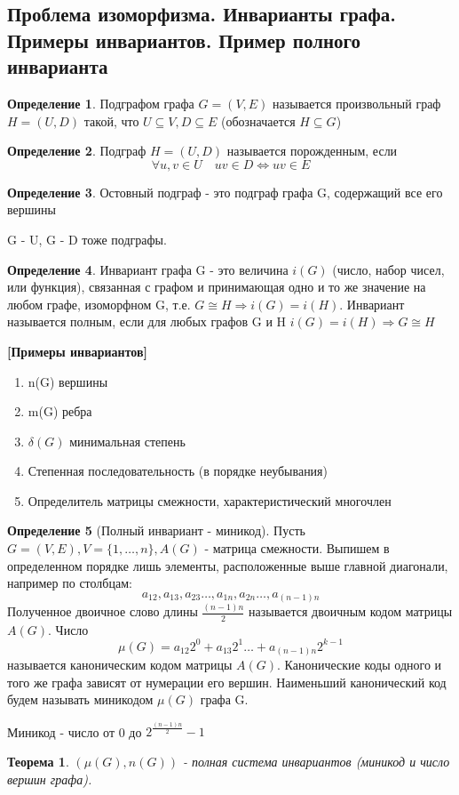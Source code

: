 \documentclass[a4paper]{article}
\newtheorem{theorem}{Теорема}[section]
\theoremstyle{definition}
\newtheorem*{definition}{Определение}
\theoremstyle{remark}
\begin{document}
\begin{multicols*}{2}
    \section{Проблема изоморфизма. Инварианты графа. Примеры инвариантов. Пример полного 
    инварианта}
    \begin{definition}
        Подграфом графа $G = (V, E)$ называется произвольный граф $H = (U, D)$ такой, что $U\subseteq V, D \subseteq E$ (обозначается $H\subseteq G$)
    \end{definition}
    \begin{definition}
        Подграф $H = (U, D)$ называется порожденным, если 
        $$\forall u, v\in U \quad uv\in D \Leftrightarrow uv \in E$$
    \end{definition}
    \begin{definition}
        Остовный подграф - это подграф графа G, содержащий все его вершины
    \end{definition}
    G - U, G - D тоже подграфы.
    \begin{definition}
        Инвариант графа G - это величина $i(G)$ (число, набор чисел, или функция), связанная с графом и принимающая одно и то же значение на любом графе, изоморфном G, т.е. $G\cong H \Rightarrow i(G)=i(H).$ Инвариант называется полным, если для любых графов G и H $i(G) = i(H) \Rightarrow G\cong H$
    \end{definition}
    \textbf{[Примеры инвариантов]}
    \begin{enumerate}
        \item n(G) вершины
        \item m(G) ребра
        \item $\delta(G)$ минимальная степень
        \item Степенная последовательность (в порядке неубывания)
        \item Определитель матрицы смежности, характеристический многочлен
    \end{enumerate}
    \begin{definition}[Полный инвариант - миникод]
        Пусть $G = (V, E), V = \{1, \dots, n\}, A(G)$ - матрица смежности.
        Выпишем в определенном порядке лишь элементы, расположенные выше главной диагонали, например по столбцам:
        $$a_{12}, a_{13}, a_{23}\dots, a_{1n}, a_{2n}\dots, a_{(n-1)n}$$
        Полученное двоичное слово длины $\frac{(n-1)n}{2}$ называется двоичным кодом матрицы $A(G)$. Число
        $$\mu(G) = a_{12} 2^0 + a_{13} 2^1\dots+ a_{(n-1)n}2^{k-1}$$
        называется каноническим кодом матрицы $A(G)$.
        Канонические коды одного и того же графа зависят от нумерации его вершин. Наименьший канонический код будем называть миникодом $\mu(G)$ графа G.
    \end{definition}
    Миникод - число от 0 до $2^{\frac{(n-1)n}{2}} - 1$
    \begin{theorem}
        $(\mu(G), n(G))$ - полная система инвариантов (миникод и число вершин графа).
    \end{theorem}

\end{multicols*}
\end{document}
